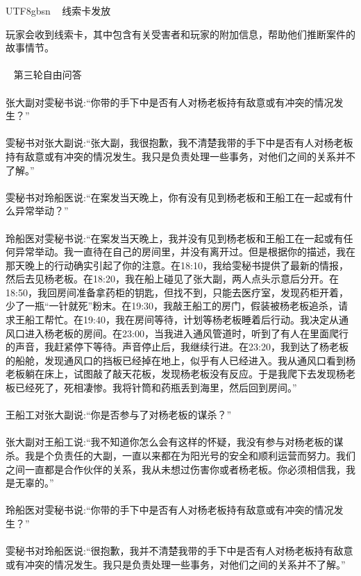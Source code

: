 \documentclass[11pt]{article}
\begin{document}
{\begin{CJK}{UTF8}{gbsn}
\ \raisedrule[.5ex]{1pt} 线索卡发放 \raisedrule[.5ex]{1pt} \ 

玩家会收到线索卡，其中包含有关受害者和玩家的附加信息，帮助他们推断案件的故事情节。\\\\

\ \raisedrule[.5ex]{1pt} 第三轮自由问答 \raisedrule[.5ex]{1pt} \ \\\\
张大副对雯秘书说:``你带的手下中是否有人对杨老板持有敌意或有冲突的情况发生？''\\ \\
雯秘书对张大副说:``张大副，我很抱歉，我不清楚我带的手下中是否有人对杨老板持有敌意或有冲突的情况发生。我只是负责处理一些事务，对他们之间的关系并不了解。''\\ \\
雯秘书对玲船医说:``在案发当天晚上，你有没有见到杨老板和王船工在一起或有什么异常举动？''\\ \\
玲船医对雯秘书说:``在案发当天晚上，我并没有见到杨老板和王船工在一起或有任何异常举动。我一直待在自己的房间里，并没有离开过。但是根据你的描述，我在那天晚上的行动确实引起了你的注意。在18:10，我给雯秘书提供了最新的情报，然后去见杨老板。在18:20，我在船上碰见了张大副，两人点头示意后分开。在18:50，我回房间准备拿药柜的钥匙，但找不到，只能去医疗室，发现药柜开着，少了一瓶“一针就死”粉末。在19:30，我敲王船工的房门，假装被杨老板追杀，请求王船工帮忙。在19:40，我在房间等待，计划等杨老板睡着后行动。我决定从通风口进入杨老板的房间。在23:00，当我进入通风管道时，听到了有人在里面爬行的声音，我赶紧停下等待。声音停止后，我继续行进。在23:20，我到达了杨老板的船舱，发现通风口的挡板已经掉在地上，似乎有人已经进入。我从通风口看到杨老板躺在床上，试图敲了敲天花板，发现杨老板没有反应。于是我爬下去发现杨老板已经死了，死相凄惨。我将针筒和药瓶丢到海里，然后回到房间。''\\ \\
王船工对张大副说:``你是否参与了对杨老板的谋杀？''\\ \\
张大副对王船工说:``我不知道你怎么会有这样的怀疑，我没有参与对杨老板的谋杀。我是个负责任的大副，一直以来都在为阳光号的安全和顺利运营而努力。我们之间一直都是合作伙伴的关系，我从未想过伤害你或者杨老板。你必须相信我，我是无辜的。''\\ \\
玲船医对雯秘书说:``你带的手下中是否有人对杨老板持有敌意或有冲突的情况发生？''\\ \\
雯秘书对玲船医说:``很抱歉，我并不清楚我带的手下中是否有人对杨老板持有敌意或有冲突的情况发生。我只是负责处理一些事务，对他们之间的关系并不了解。''\\ \\


\end{CJK}}
\end{document}

